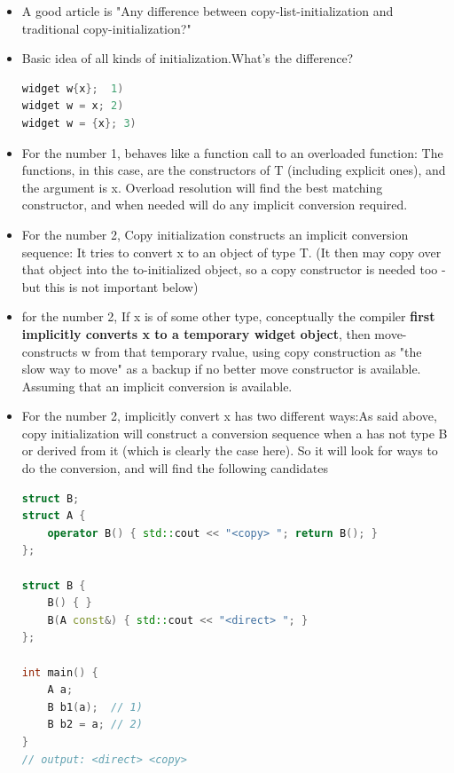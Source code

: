 \documentclass[a4paper,11pt,twoside]{book}
\begin{document}
\begin{itemize}
	\item A good article is "Any difference between copy-list-initialization and traditional copy-initialization?"
	
	\item Basic idea of all kinds of initialization.What's the difference?
\begin{lstlisting}[frame=single, language=c++]
widget w{x};  1)
widget w = x; 2)
widget w = {x}; 3)
\end{lstlisting}
	\item For the number 1, behaves like a function call to an overloaded function: The functions, in this case, are the constructors of T (including explicit ones), and the argument is x. Overload resolution will find the best matching constructor, and when needed will do any implicit conversion required.
	
	\item For the number 2, Copy initialization constructs an implicit conversion sequence: It tries to convert x to an object of type T. (It then may copy over that object into the to-initialized object, so a copy constructor is needed too - but this is not important below)
	
	\item for the number 2, If x is of some other type, conceptually the compiler \textbf{first implicitly converts x to a temporary widget object}, then move-constructs w from that temporary rvalue, using copy construction as "the slow way to move" as a backup if no better move constructor is available. Assuming that an implicit conversion is available.
	
	\item For the number 2, implicitly convert x has two different ways:As said above, copy initialization will construct a conversion sequence when a has not type B or derived from it (which is clearly the case here). So it will look for ways to do the conversion, and will find the following candidates
	
\begin{lstlisting}[frame=single, language=c++]
struct B;
struct A { 
	operator B() { std::cout << "<copy> "; return B(); }
};
	
struct B { 
	B() { }
	B(A const&) { std::cout << "<direct> "; }
};
	
int main() { 
	A a;
	B b1(a);  // 1)
	B b2 = a; // 2)
}
// output: <direct> <copy>
\end{lstlisting}
	

\end{itemize}
\end{document}
